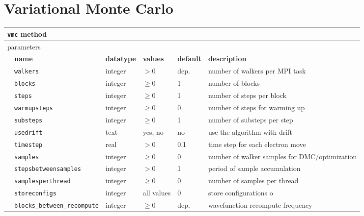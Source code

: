 \section{Variational Monte Carlo}
\label{sec:vmc}

\begin{table}[h]
\begin{tabularx}{\textwidth}{l l l l l X }
\hline
\multicolumn{6}{l}{\texttt{vmc} method} \\
\hline
\multicolumn{2}{l}{parameters}  & \multicolumn{4}{l}{}\\
   &   \bfseries name     & \bfseries datatype & \bfseries values & \bfseries default   & \bfseries description \\
   &   \texttt{walkers             } &  integer  & $> 0$   & dep.& number of walkers per MPI task  \\
   &   \texttt{blocks              } &  integer  & $\ge 0$ & 1   & number of blocks            \\
   &   \texttt{steps               } &  integer  & $\ge 0$ & 1   & number of steps per block   \\
   &   \texttt{warmupsteps         } &  integer  & $\ge 0$ & 0   & number of steps for warming up\\
   &   \texttt{substeps            } &  integer  & $\ge 0$ & 1   & number of substeps per step \\
   &   \texttt{usedrift            } &  text     & yes, no & no  & use the algorithm with drift\\
   &   \texttt{timestep            } &  real     & $> 0$   & 0.1 & time step for each electron move \\
   &   \texttt{samples             } &  integer  & $\ge 0$ & 0   & number of walker samples for DMC/optimization\\
   &   \texttt{stepsbetweensamples } &  integer  & $> 0$   & 1   & period of sample accumulation\\
   &   \texttt{samplesperthread    } &  integer  & $\ge 0$ & 0   & number of samples per thread  \\
   &   \texttt{storeconfigs        } &  integer  & all values & 0   & store configurations o  \\
   &   \texttt{blocks\_between\_recompute} &  integer  & $\ge 0$ & dep.  & wavefunction recompute frequency  \\
  \hline
\end{tabularx}
\end{table}

